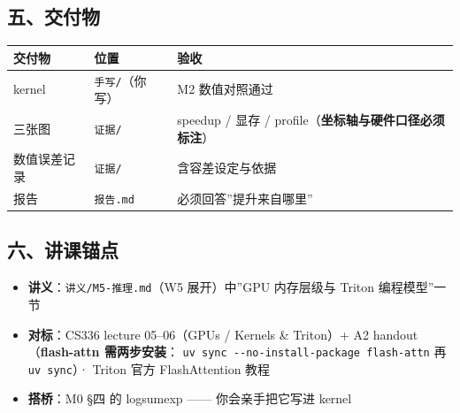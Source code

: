 \documentclass[
  chinese,
  11pt,
]{ctexart}
\newcounter{none} %
\providecommand{\tightlist}{%
  \setlength{\itemsep}{0pt}\setlength{\parskip}{0pt}}
\begin{document}
\subsection{五、交付物}\label{ux4e94ux4ea4ux4ed8ux7269}

{\def\LTcaptype{none} %
\begin{longtable}[]{@{}
  >{\raggedright\arraybackslash}p{}
  >{\raggedright\arraybackslash}p{}
  >{\raggedright\arraybackslash}p{}@{}}
\toprule\noalign{}
\begin{minipage}[b]{\linewidth}\raggedright
交付物
\end{minipage} & \begin{minipage}[b]{\linewidth}\raggedright
位置
\end{minipage} & \begin{minipage}[b]{\linewidth}\raggedright
验收
\end{minipage} \\
\midrule\noalign{}
\endhead
\bottomrule\noalign{}
\endlastfoot
kernel & \texttt{手写/}（你写） & M2 数值对照通过 \\
三张图 & \texttt{证据/} & speedup / 显存 / profile（\textbf{坐标轴与硬件口径必须标注}） \\
数值误差记录 & \texttt{证据/} & 含容差设定与依据 \\
报告 & \texttt{报告.md} & 必须回答''提升来自哪里'' \\
\end{longtable}
}

\subsection{六、讲课锚点}\label{ux516dux8bb2ux8bfeux951aux70b9}

\begin{itemize}
\tightlist
\item
  \textbf{讲义}：\texttt{讲义/M5-推理.md}（W5 展开）中''GPU 内存层级与 Triton 编程模型''一节
\item
  \textbf{对标}：CS336 lecture 05--06（GPUs / Kernels \& Triton）+ A2 handout（\textbf{flash-attn 需两步安装}： \texttt{uv\ sync\ -\/-no-install-package\ flash-attn} 再 \texttt{uv\ sync}）· Triton 官方 FlashAttention 教程
\item
  \textbf{搭桥}：M0 §四 的 logsumexp ------ 你会亲手把它写进 kernel
\end{itemize}
\end{document}

